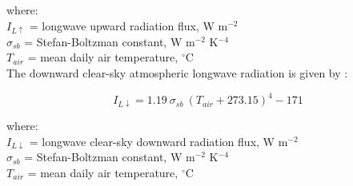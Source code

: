 \noindent where: \\
\indent $I_{L\uparrow}$ = longwave upward radiation flux, W m$^{-2}$\\
\indent $\sigma_{sb}$ = Stefan-Boltzman constant, W m$^{-2}$ K$^{-4}$\\
\indent $T_{air}$ = mean daily air temperature, $^{\circ}$C \\

\noindent The downward clear-sky atmospheric longwave radiation is given by \parencite[Eq. 20]{linacre68}:

\begin{equation}
\label{eq:rld}
	I_{L\downarrow} = 1.19\:\sigma_{sb}\: \left(T_{air} + 273.15 \right)^4 - 171
\end{equation}

\noindent where: \\
\indent $I_{L\downarrow}$ = longwave clear-sky downward radiation flux, W m$^{-2}$\\
\indent $\sigma_{sb}$ = Stefan-Boltzman constant, W m$^{-2}$ K$^{-4}$\\
\indent $T_{air}$ = mean daily air temperature, $^{\circ}$C \\

